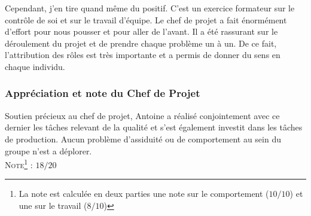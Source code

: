 Cependant, j’en tire quand même du positif. C’est un exercice formateur sur le contrôle de soi et sur le travail d’équipe. Le chef de projet a fait énormément d’effort pour nous pousser et pour aller de l’avant. Il a été rassurant sur le déroulement du projet et de prendre chaque problème un à un. De ce fait, l’attribution des rôles est très importante et a permis de donner du sens en chaque individu.

\subsubsection{Appréciation et note du Chef de Projet}

Soutien précieux au chef de projet, Antoine a réalisé conjointement avec ce dernier les tâches relevant de la qualité et s’est également investit dans les tâches de production.
Aucun problème d’assiduité ou de comportement au sein du groupe n’est a déplorer.\\

\noindent\textsc{Note\footnote{La note est calculée en deux parties une note sur le comportement ($10/10$) et une sur le travail ($8/10$)} :} $18/20$